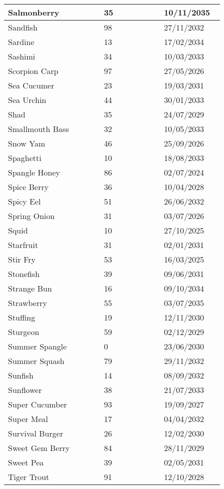 \documentclass{article}
\begin{document}
\begin{longtable}{|p{0.4\linewidth}|p{0.25\linewidth}|p{0.25\linewidth}|}
\hline
Salmonberry & 35 & 10/11/2035 \\
\hline
Sandfish & 98 & 27/11/2032 \\
\hline
Sardine & 13 & 17/02/2034 \\
\hline
Sashimi & 34 & 10/03/2033 \\
\hline
Scorpion Carp & 97 & 27/05/2026 \\
\hline
Sea Cucumer & 23 & 19/03/2031 \\
\hline
Sea Urchin & 44 & 30/01/2033 \\
\hline
Shad & 35 & 24/07/2029 \\
\hline
Smallmouth Bass & 32 & 10/05/2033 \\
\hline
Snow Yam & 46 & 25/09/2026 \\
\hline
Spaghetti & 10 & 18/08/2033 \\
\hline
Spangle Honey & 86 & 02/07/2024 \\
\hline
Spice Berry & 36 & 10/04/2028 \\
\hline
Spicy Eel & 51 & 26/06/2032 \\
\hline
Spring Onion & 31 & 03/07/2026 \\
\hline
Squid & 10 & 27/10/2025 \\
\hline
Starfruit & 31 & 02/01/2031 \\
\hline
Stir Fry & 53 & 16/03/2025 \\
\hline
Stonefish & 39 & 09/06/2031 \\
\hline
Strange Bun & 16 & 09/10/2034 \\
\hline
Strawberry & 55 & 03/07/2035 \\
\hline
Stuffing & 19 & 12/11/2030 \\
\hline
Sturgeon & 59 & 02/12/2029 \\
\hline
Summer Spangle & 0 & 23/06/2030 \\
\hline
Summer Squash & 79 & 29/11/2032 \\
\hline
Sunfish & 14 & 08/09/2032 \\
\hline
Sunflower & 38 & 21/07/2033 \\
\hline
Super Cucumber & 93 & 19/09/2027 \\
\hline
Super Meal & 17 & 04/04/2032 \\
\hline
Survival Burger & 26 & 12/02/2030 \\
\hline
Sweet Gem Berry & 84 & 28/11/2029 \\
\hline
Sweet Pea & 39 & 02/05/2031 \\
\hline
Tiger Trout & 91 & 12/10/2028 \\

\end{longtable}
\end{document}
